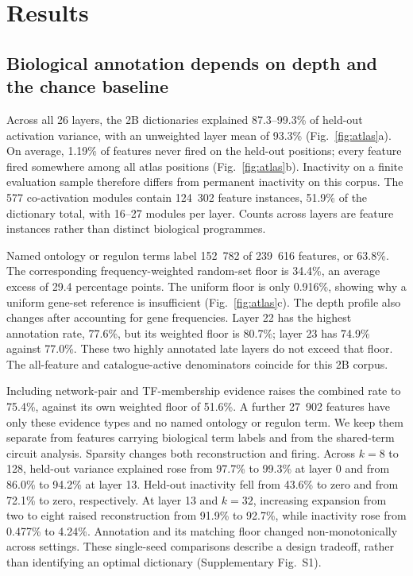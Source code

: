 \documentclass[review,authoryear,12pt]{elsarticle}
\begin{document}
\section{Results}

\subsection{Biological annotation depends on depth and the chance baseline}

Across all 26 layers, the 2B dictionaries explained 87.3--99.3\% of held-out activation variance,
with an unweighted layer mean of 93.3\% (Fig.~\ref{fig:atlas}a). On average, 1.19\% of features
never fired on the held-out positions; every feature fired somewhere among all atlas positions
(Fig.~\ref{fig:atlas}b). Inactivity on a finite evaluation sample therefore differs from permanent
inactivity on this corpus. The 577 co-activation modules contain 124~302 feature instances,
51.9\% of the dictionary total, with 16--27 modules per layer. Counts across layers are feature
instances rather than distinct biological programmes.

Named ontology or regulon terms label 152~782 of 239~616 features, or 63.8\%. The corresponding
frequency-weighted random-set floor is 34.4\%, an average excess of 29.4 percentage points.
The uniform floor is only 0.916\%, showing why a uniform gene-set reference is insufficient
(Fig.~\ref{fig:atlas}c). The depth profile also changes after accounting for gene frequencies.
Layer 22 has the highest annotation rate, 77.6\%, but its weighted floor is 80.7\%; layer 23
has 74.9\% against 77.0\%. These two highly annotated late layers do not exceed that
floor. The all-feature and catalogue-active denominators coincide for this 2B corpus.

Including network-pair and TF-membership evidence raises the combined rate to 75.4\%, against
its own weighted floor of 51.6\%. A further 27~902 features have only these evidence types and
no named ontology or regulon term. We keep them separate from features carrying biological
term labels and from the shared-term circuit analysis.
Sparsity changes both reconstruction and firing. Across $k=8$ to 128, held-out variance explained
rose from 97.7\% to 99.3\% at layer 0 and from 86.0\% to 94.2\% at layer 13. Held-out inactivity
fell from 43.6\% to zero and from 72.1\% to zero, respectively. At layer 13 and $k=32$, increasing
expansion from two to eight raised reconstruction from 91.9\% to 92.7\%, while inactivity rose
from 0.477\% to 4.24\%. Annotation and its matching floor changed non-monotonically across
settings. These single-seed comparisons describe a design tradeoff, rather than identifying an
optimal dictionary (Supplementary Fig.~S1).
\end{document}

